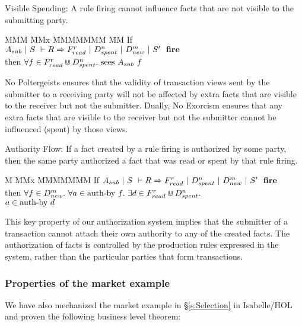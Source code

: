 \begin{theorem}
Visible Spending: A rule firing cannot influence facts that are not visible to the submitting party.
\end{theorem}
\begin{tabbing}
MMM \= MMx \= MMMMMMM \= MM \kill
\> If     \> $A_{sub}~|~S~\vdash R \Rightarrow F_{read}^r~|~D_{spent}^n~|~D_{new}^m~|~S'~~\textbf{fire}$ \\
\> then   \> $\forall f \in F_{read}^r \Cup D_{spent}^n.\ \textrm{sees}~ A_{sub}~ f$
\end{tabbing}

No Poltergeists ensures that the validity of transaction views sent by the submitter to a receiving party will not be affected by extra facts that are visible to the receiver but not the submitter. Dually, No Exorcism ensures that any extra facts that are visible to the receiver but not the submitter cannot be influenced (spent) by those views.


\begin{theorem}
Authority Flow: If a fact created by a rule firing is authorized by some party, then the same party authorized a fact that was read or spent by that rule firing.
\end{theorem}
\begin{tabbing}
M \= MMx \= MMMMMMM \kill
\> If   \> $A_{sub}~|~S~\vdash R \Rightarrow F_{read}^r~|~D_{spent}^n~|~D_{new}^m~|~S'~~\textbf{fire}$ \\
\> then \> $\forall f \in D_{new}^m.\
            \forall a \in \textrm{auth-by}~f.\
            \exists d \in F_{read}^r \Cup D_{spent}^n.$ \\
\>      \> \hspace{1em}$a \in \textrm{auth-by}~d$
\end{tabbing}

This key property of our authorization system implies that the submitter of a transaction cannot attach their own authority to any of the created facts. The authorization of facts is controlled by the production rules expressed in the system, rather than the particular parties that form transactions.


\eject{}
\subsubsection{Properties of the market example}
We have also mechanized the market example in \S\ref{s:Selection} in Isabelle/HOL and proven the following business level theorem:

